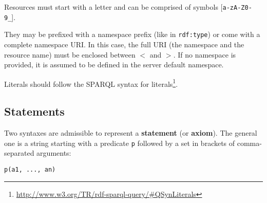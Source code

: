 Resources must start with a letter and can be comprised of
symbols [{\tt a-zA-Z0-9\_}].

They may be prefixed with a namespace prefix (like in \texttt{rdf:type}) or
come with a complete namespace URI.
In this case, the full URI (the namespace and the resource name) must be
enclosed between $<$ and $>$. If no namespace is provided, it is assumed to be
defined in the server default namespace.

Literals should follow the SPARQL syntax for
literals\footnote{\url{http://www.w3.org/TR/rdf-sparql-query/\#QSynLiterals}}.
%
%
%
%
%
%
%
%
\subsection{Statements}



Two syntaxes are admissible to represent a \textbf{statement} (or
\textbf{axiom}).  The general one is a string starting with a predicate
\texttt{p} followed by a set in brackets of comma-separated arguments:

    \begin{center} \tt p(a1, ..., an) \end{center}

